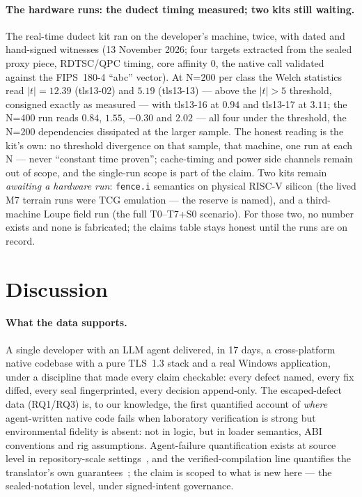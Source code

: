 \documentclass[11pt,a4paper]{article}
\newcommand{\code}[1]{\texttt{\small #1}}
\begin{document}
\paragraph{The hardware runs: the dudect timing measured; two kits still
waiting.} The real-time dudect kit ran on the developer's machine,
twice, with dated and hand-signed witnesses (13 November 2026; four
targets extracted from the sealed proxy piece, RDTSC/QPC timing, core
affinity 0, the native call validated against the FIPS~180-4 ``abc''
vector). At N=200 per class the Welch statistics read $|t| = 12.39$
(tls13-02) and $5.19$ (tls13-13) --- above the $|t|>5$ threshold,
consigned exactly as measured --- with tls13-16 at $0.94$ and tls13-17
at $3.11$; the N=400 run reads $0.84$, $1.55$, $-0.30$ and $2.02$ ---
all four under the threshold, the N=200 dependencies dissipated at the
larger sample. The honest reading is the kit's own: no threshold
divergence on that sample, that machine, one run at each N --- never
``constant time proven''; cache-timing and power side channels remain
out of scope, and the single-run scope is part of the claim. Two kits
remain \emph{awaiting a hardware run}: \code{fence.i} semantics on
physical RISC-V silicon (the lived M7 terrain runs were TCG emulation
--- the reserve is named), and a third-machine Loupe field run (the
full T0--T7+S0 scenario). For those two, no number exists and none is
fabricated; the claims table stays honest until the runs are on record.



\section{Discussion}\label{sec:discussion}

\paragraph{What the data supports.} A single developer with an LLM agent
delivered, in 17 days, a cross-platform native codebase with a pure
TLS~1.3 stack and a real Windows application, under a discipline that
made every claim checkable: every defect named, every fix diffed, every
seal fingerprinted, every decision append-only. The escaped-defect data
(RQ1/RQ3) is, to our knowledge, the first quantified account of
\emph{where} agent-written native code fails when laboratory verification
is strong but environmental fidelity is absent: not in logic, but in
loader semantics, ABI conventions and rig assumptions. Agent-failure
quantification exists at source level in repository-scale
settings~\cite{yang2024sweagent}, and the verified-compilation line
quantifies the translator's own guarantees~\cite{leroycompcert}; the
claim is scoped to what is new here --- the sealed-notation level, under
signed-intent governance.
\end{document}
